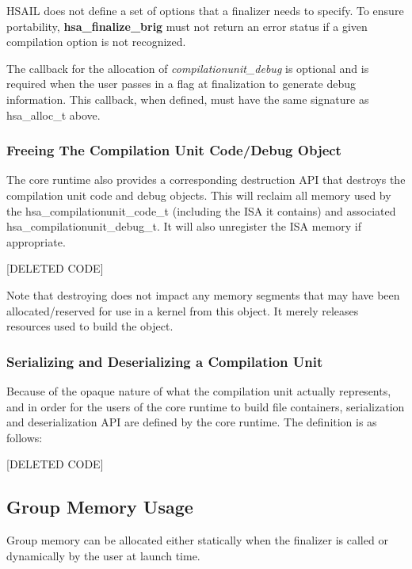 \documentclass[draft]{book}
\newcommand{\hsaarg}[1]{\textit{#1}}
\newcommand{\reffun}[1]{\textbf{#1}}
\newcommand{\reftyp}[1]{#1}
\begin{document}
HSAIL does not define a set of options that a finalizer needs to specify. To
ensure portability, \reffun{hsa_finalize_brig} must not return an error status
if a given compilation option is not recognized.

The callback for the allocation of \hsaarg{compilationunit_debug} is optional
and is required when the user passes in a flag at finalization to generate debug
information. This callback, when defined, must have the same signature as
\reftyp{hsa_alloc_t} above.

\subsubsection{Freeing The Compilation Unit Code/Debug Object}
The core runtime also provides a corresponding destruction API that destroys the
compilation unit code and debug objects. This will reclaim all memory used by
the \reftyp{hsa_compilationunit_code_t} (including the ISA it contains) and
associated \reftyp{hsa_compilationunit_debug_t}. It will also unregister the
ISA memory if appropriate.

[DELETED CODE]

Note that destroying does not impact any memory segments that may have been
allocated/reserved for use in a kernel from this object. It merely releases
resources used to build the object.

\subsubsection{Serializing and Deserializing a Compilation Unit}

Because of the opaque nature of what the compilation unit actually represents,
and in order for the users of the core runtime to build file containers,
serialization and deserialization API are defined by the core runtime. The
definition is as follows:

[DELETED CODE]

\hypertarget{groupmem}{}\subsection{Group Memory
  Usage}\label{groupmem} Group memory can be allocated either
statically when the finalizer is called or dynamically by the user at launch
time.
\end{document}
